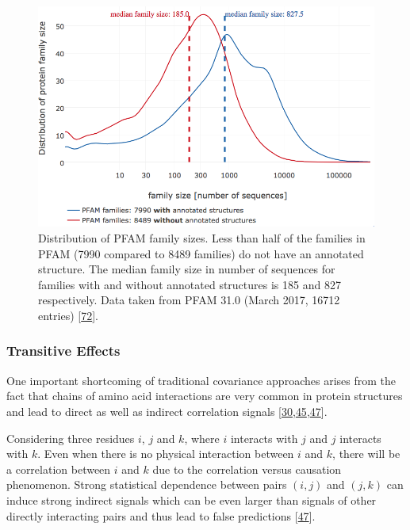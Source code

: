 \documentclass[12pt,a4paper,twoside]{book}
\theoremstyle{definition}
\theoremstyle{definition}
\theoremstyle{remark}
\begin{document}
\begin{figure}

{\centering \includegraphics[width=0.9\linewidth]{img/pfam_pdb_notitle} 

}

\caption{Distribution of PFAM family sizes. Less than half of
the families in PFAM (7990 compared to 8489 families) do not have an
annotated structure. The median family size in number of sequences for
families with and without annotated structures is 185 and 827
respectively. Data taken from PFAM 31.0 (March 2017, 16712 entries)
{[}\protect\hyperlink{ref-Finn2016}{72}{]}.}\label{fig:pfam}
\end{figure}

\hypertarget{transitive-effects}{\subsubsection*{Transitive
Effects}\label{transitive-effects}}

One important shortcoming of traditional covariance approaches arises
from the fact that chains of amino acid interactions are very common in
protein structures and lead to direct as well as indirect correlation
signals
{[}\protect\hyperlink{ref-Weigt2009}{30},\protect\hyperlink{ref-Lapedes1999}{45},\protect\hyperlink{ref-Burger2010}{47}{]}.

Considering three residues \(i\), \(j\) and \(k\), where \(i\) interacts
with \(j\) and \(j\) interacts with \(k\). Even when there is no
physical interaction between \(i\) and \(k\), there will be a
correlation between \(i\) and \(k\) due to the correlation versus
causation phenomenon. Strong statistical dependence between pairs
\((i,j)\) and \((j,k)\) can induce strong indirect signals which can be
even larger than signals of other directly interacting pairs and thus
lead to false predictions {[}\protect\hyperlink{ref-Burger2010}{47}{]}.
\end{document}
